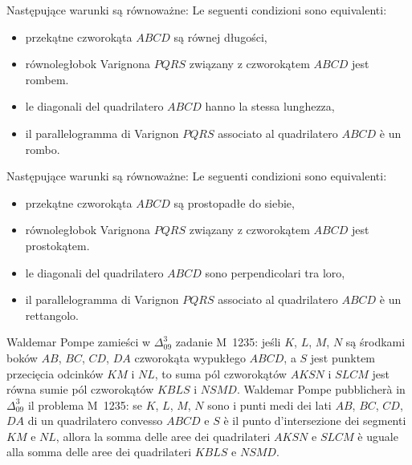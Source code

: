 \begin{proposition}
    Następujące warunki są równoważne: %
    Le seguenti condizioni sono equivalenti: %
    \begin{itemize}
        \item przekątne czworokąta $ABCD$ są równej długości, %
        \item równoległobok Varignona $PQRS$ związany z czworokątem $ABCD$ jest rombem. %
        \item le diagonali del quadrilatero $ABCD$ hanno la stessa lunghezza, %
        \item il parallelogramma di Varignon $PQRS$ associato al quadrilatero $ABCD$ è un rombo. %
    \end{itemize}
\end{proposition}

\begin{proposition}
    Następujące warunki są równoważne: %
    Le seguenti condizioni sono equivalenti: %
    \begin{itemize}
        \item przekątne czworokąta $ABCD$ są prostopadłe do siebie, %
        \item równoległobok Varignona $PQRS$ związany z czworokątem $ABCD$ jest prostokątem. %
        \item le diagonali del quadrilatero $ABCD$ sono perpendicolari tra loro, %
        \item il parallelogramma di Varignon $PQRS$ associato al quadrilatero $ABCD$ è un rettangolo. %
    \end{itemize}
\end{proposition}

Waldemar Pompe zamieści w $\Delta_{09}^{3}$ zadanie M~1235: jeśli $K$, $L$, $M$, $N$ są środkami boków $AB$, $BC$, $CD$, $DA$ czworokąta wypukłego $ABCD$, a $S$ jest punktem przecięcia odcinków $KM$ i $NL$, to suma pól czworokątów $AKSN$ i $SLCM$ jest równa sumie pól czworokątów $KBLS$ i $NSMD$. %
Waldemar Pompe pubblicherà in $\Delta_{09}^{3}$ il problema M~1235: se $K$, $L$, $M$, $N$ sono i punti medi dei lati $AB$, $BC$, $CD$, $DA$ di un quadrilatero convesso $ABCD$ e $S$ è il punto d'intersezione dei segmenti $KM$ e $NL$, allora la somma delle aree dei quadrilateri $AKSN$ e $SLCM$ è uguale alla somma delle aree dei quadrilateri $KBLS$ e $NSMD$. %


%
